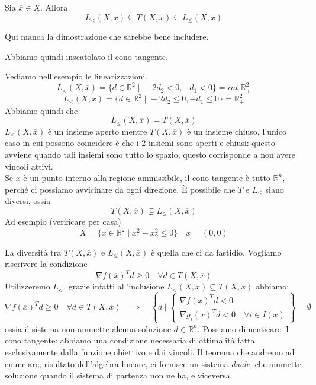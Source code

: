 \begin{proposition}
  Sia $\overline{x} \in X $.
 Allora
 $$L_{<} (X, \overline{x}) \subseteq T(X, \overline{x})
 \subseteq L_{\leq}(X, \overline{x}) $$
\begin{todo}
Qui manca la dimostrazione che sarebbe bene includere.
\end{todo}
\end{proposition}
Abbiamo quindi inscatolato il cono tangente.
\begin{example}
Vediamo nell'esempio le linearizzazioni.
$$ L_{<}(X, \overline{x}) = \{ d \in \mathbb{R}^{2} \; | \;
-2 d_2 < 0, - d_1 < 0 \}  = int\; \mathbb{R}^{2}_{+}$$
$$ L_{\leq}(X, \overline{x}) = \{ d \in \mathbb{R}^{2} \; | \;
-2 d_2 \leq 0, - d_1 \leq 0 \}  =  \mathbb{R}^{2}_{+}$$
Abbiamo quindi che
$$ L_{\leq}(X, \overline{x}) = T(X, \overline{x})$$
$L_{<}(X, \overline{x})$ \`e un insieme aperto mentre $T(X, \overline{x})$ \`e un insieme chiuso,
l'unico caso in cui possono coincidere \`e che i 2 insiemi sono aperti e
chiusi: questo avviene quando tali insiemi sono tutto lo spazio, questo
corrisponde a non avere vincoli attivi. \\
Se $\overline{x}$ \`e un punto interno alla regione ammissibile,
il cono tangente \`e tutto $\mathbb{R}^{n}$, perch\'e ci possiamo
avvicinare da ogni direzione.
\`E possibile che $T$ e $L_{\leq}$ siano diversi, ossia
$$ T(X, \overline{x}) \subsetneq L_{\leq}(X, \overline{x})$$
Ad esempio (verificare per casa)
$$ X = \{ x \in \mathbb{R}^{2} \; | \; x_1^{2} - x_2^{2} \leq 0 \}
\quad \overline{x} = (0,0)
$$
\end{example}
La diversit\`a tra $T(X, \overline{x}) $ e $L_{\leq}(X, \overline{x})$ \`e quella che ci da fastidio.
Vogliamo riscrivere la condizione
$$ \nabla f(\overline{x})^{T} d \geq 0 \quad
\forall d \in T(X, \overline{x}) $$
Utilizzeremo $L_{<}$, grazie infatti all'inclusione
$L_{<}(X, \overline{x}) \subseteq T(X, \overline{x})$ abbiamo:
$$
\nabla f(\overline{x})^{T} d \geq 0 \quad
\forall d \in T(X, \overline{x})
\quad \Longrightarrow \quad
\left\lbrace d ~| \; \left\{
\begin{array}{l}
\nabla f(\overline{x})^{T} d < 0 \\
 \nabla  g_i(\overline{x})^{T} d < 0 \quad \forall i \in I(\overline{x})
\end{array}
\right.
\right\rbrace
= \emptyset
$$
ossia il sistema non ammette alcuna soluzione
$d \in \mathbb{R}^{n}$.
Possiamo dimenticare il cono tangente: abbiamo una condizione
necessaria di ottimalit\`a fatta esclusivamente dalla funzione
obiettivo e dai vincoli. Il teorema che andremo ad enunciare,
risultato dell'algebra lineare, ci fornisce un sistema \emph{duale},
che ammette soluzione quando il sistema di partenza non ne ha, 
e viceversa.

